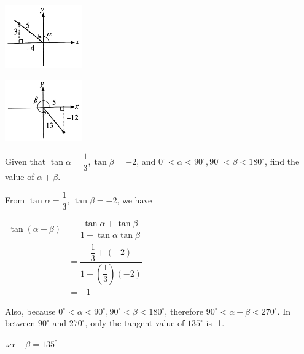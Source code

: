 \documentclass{report}
\begin{document}
\begin{question}
\begin{multicols}{2}
		\columnbreak
		
		\begin{center}
			\includegraphics[width=0.25\textwidth]{assets/11-3.jpg}
		\end{center}
		\begin{center}
			\includegraphics[width=0.25\textwidth]{assets/11-4.jpg}
		\end{center}
	\end{multicols}
\end{question}

\begin{question}
	Given that $\tan \alpha=\dfrac{1}{3}, \tan \beta=-2$, and $0^{\circ}<\alpha<90^{\circ}, 90^{\circ}<\beta<180^{\circ}$, find the value of $\alpha+\beta$.
	
	\sol{}
	
	\noindent From $\tan \alpha=\dfrac{1}{3}$, $\tan\beta = -2$, we have 
	
	\noindent $\begin{aligned} \tan (\alpha+\beta) & =\dfrac{\tan \alpha+\tan \beta}{1-\tan \alpha \tan \beta} \\ & =\dfrac{\dfrac{1}{3}+(-2)}{1-\left(\dfrac{1}{3}\right)(-2)} \\ & =-1\end{aligned}$
	
	\noindent Also, because $0^{\circ}<\alpha<90^{\circ}, 90^{\circ}<\beta<180^{\circ}$, therefore $90^{\circ}<\alpha+\beta<270^{\circ}$. In between $90^{\circ}$ and $270^{\circ}$, only the tangent value of $135^{\circ}$ is -1.
	
	\noindent $\therefore \alpha+\beta=135^{\circ}$
\end{question}
\end{document}
